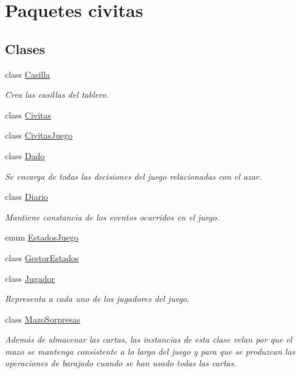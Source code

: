 \hypertarget{namespacecivitas}{}\section{Paquetes civitas}
\label{namespacecivitas}
\subsection*{Clases}
\begin{DoxyCompactItemize}
\item 
class \hyperlink{classcivitas_1_1Casilla}{Casilla}
\begin{DoxyCompactList}\small\item\em Crea las casillas del tablero. \end{DoxyCompactList}\item 
class \hyperlink{classcivitas_1_1Civitas}{Civitas}
\item 
class \hyperlink{classcivitas_1_1CivitasJuego}{Civitas\+Juego}
\item 
class \hyperlink{classcivitas_1_1Dado}{Dado}
\begin{DoxyCompactList}\small\item\em Se encarga de todas las decisiones del juego relacionadas con el azar. \end{DoxyCompactList}\item 
class \hyperlink{classcivitas_1_1Diario}{Diario}
\begin{DoxyCompactList}\small\item\em Mantiene constancia de los eventos ocurridos en el juego. \end{DoxyCompactList}\item 
enum \hyperlink{enumcivitas_1_1EstadosJuego}{Estados\+Juego}
\item 
class \hyperlink{classcivitas_1_1GestorEstados}{Gestor\+Estados}
\item 
class \hyperlink{classcivitas_1_1Jugador}{Jugador}
\begin{DoxyCompactList}\small\item\em Representa a cada uno de los jugadores del juego. \end{DoxyCompactList}\item 
class \hyperlink{classcivitas_1_1MazoSorpresas}{Mazo\+Sorpresas}
\begin{DoxyCompactList}\small\item\em Además de almacenar las cartas, las instancias de esta clase velan por que el mazo se mantenga consistente a lo largo del juego y para que se produzcan las operaciones de barajado cuando se han usado todas las cartas. \end{DoxyCompactList}\item 

\end{DoxyCompactItemize}
